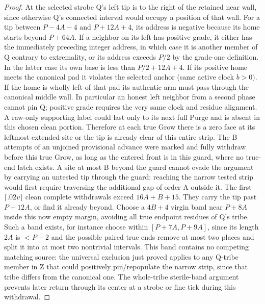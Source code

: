 \begin{proof}
At the selected strobe Q's left tip is to the right of the retained near wall, since otherwise Q's connected interval would occupy a position of that wall. For a tip between \(P- 4A- 4\) and \(P+12A+4\), its address is negative because its home starts beyond \(P+64A\). If a neighbor on its left has positive grade, it either has the immediately preceding integer address, in which case it is another member of Q contrary to extremality, or its address exceeds \(P/2\) by the grade-one definition. In the latter case its own base is less than \(P/2+12A+4\). If its positive home meets the canonical pad it violates the selected anchor (same active clock \(b>0)\). If the home is wholly left of that pad its authentic arm must pass through the canonical middle wall. In particular an honest left neighbor from a second phase cannot pin Q; positive grade requires the very same clock and residue alignment. A raw-only supporting label could last only to its next full Purge and is absent in this chosen clean portion. Therefore at each true Grow there is a zero face at its leftmost extended site or the tip is already clear of this entire strip. The B attempts of an unjoined provisional advance were marked and fully withdraw before this true Grow, as long as the entered front is in this guard, where no true-end latch exists. A site at most B beyond the guard cannot evade the argument by carrying an untested tip through the guard: reaching the narrow tested strip would first require traversing the additional gap of order A outside it. The first \(\lceil .02v \rceil \) clean complete withdrawals exceed \(16A+B+15\). They carry the tip past \(P+12A\), or find it already beyond. Choose a \(4B+4\) virgin band near \(P+8A\) inside this now empty margin, avoiding all true endpoint residues of Q's tribe. Such a band exists, for instance choose within \([P+7A,P+9A]\), since its length \(2A\) is \(<P-2\) and the possible paired true ends remove at most two places and split it into at most two nontrivial intervals. This band contains no competing matching source: the universal exclusion just proved applies to any Q-tribe member in Z that could positively pin/repopulate the narrow strip, since that tribe differs from the canonical one. The whole-tribe sterile-band argument prevents later return through its center at a strobe or fine tick during this withdrawal.


\end{proof}

